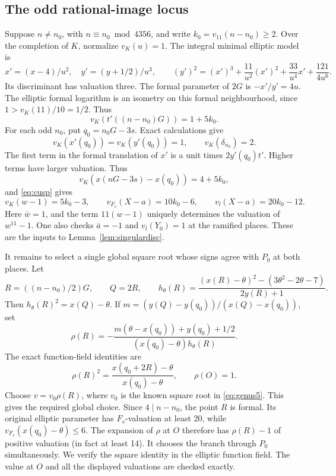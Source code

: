 \documentclass[11pt,reqno]{amsart}
\theoremstyle{definition}\newtheorem{definition}[theorem]{Definition}
\theoremstyle{remark}\newtheorem{remark}[theorem]{Remark}
\numberwithin{equation}{section}
\begin{document}
\subsection{The odd rational-image locus}
Suppose \(n\ne n_0\), with \(n\equiv n_0\bmod4356\), and write
\(k_0=v_{11}(n-n_0)\ge2\). Over the completion of \(K\), normalize
\(v_K(u)=1\). The integral minimal elliptic model is
\[
 x'=(x-4)/u^2,\quad y'=(y+1/2)/u^3,\qquad
 (y')^2=(x')^3+\frac{11}{u^2}(x')^2+
           \frac{33}{u^4}x'+\frac{121}{4u^6}.
\]
Its discriminant has valuation three. The formal parameter of \(2G\)
is \(-x'/y'=4u\). The elliptic formal logarithm is an isometry on
this formal neighbourhood, since \(1>v_K(11)/10=1/2\). Thus
\[
 v_K(t'((n-n_0)G))=1+5k_0.
\]
For each odd \(n_0\), put \(q_0=n_0G-3s\). Exact calculations give
\[
 v_K(x'(q_0))=v_K(y'(q_0))=1,\qquad v_K(\delta_{n_0})=2.
\]
The first term in the formal translation of \(x'\) is a unit times
\(2y'(q_0)t'\). Higher terms have larger valuation. Thus
\[
 v_K(x(nG-3s)-x(q_0))=4+5k_0,
\]
and \eqref{eq:cusp} gives
\begin{equation}\label{eq:odddepth}
 v_K(w-1)=5k_0-3,\qquad
 v_{F_v}(X-a)=10k_0-6,\qquad
 v_l(X-a)=20k_0-12.
\end{equation}
Here \(\bar w=1\), and the term \(11(w-1)\) uniquely determines the
valuation of \(w^{11}-1\).
One also checks \(\bar a=-1\) and \(v_l(Y_0)=1\) at the ramified
places. These are the inputs to Lemma~\ref{lem:singulardisc}.

It remains to select a single global square root whose signs agree
with \(P_0\) at both places. Let
\[
 R=((n-n_0)/2)G,\qquad Q=2R,\qquad
 h_\theta(R)=\frac{(x(R)-\theta)^2-(3\theta^2-2\theta-7)}{2y(R)+1}.
\]
Then \(h_\theta(R)^2=x(Q)-\theta\). If
\(m=(y(Q)-y(q_0))/(x(Q)-x(q_0))\), set
\[
 \rho(R)=
 -\frac{m(\theta-x(q_0))+y(q_0)+1/2}
          {(x(q_0)-\theta)h_\theta(R)}.
\]
The exact function-field identities are
\[
 \rho(R)^2=\frac{x(q_0+2R)-\theta}{x(q_0)-\theta},
 \qquad \rho(O)=1.
\]
Choose \(v=v_0\rho(R)\), where \(v_0\) is the known square root in
\eqref{eq:genus5}. This gives the required global choice.
Since \(4\mid n-n_0\), the point \(R\) is formal. Its original elliptic
parameter has \(F_v\)-valuation at least 20, while
\(v_{F_v}(x(q_0)-\theta)\le6\).
The expansion of \(\rho\) at \(O\) therefore has \(\rho(R)-1\) of
positive valuation (in fact at least 14). It chooses the branch through
\(P_0\) simultaneously. We verify the square identity in the elliptic function field.
The value at \(O\) and all the displayed valuations are checked exactly.
\end{document}

